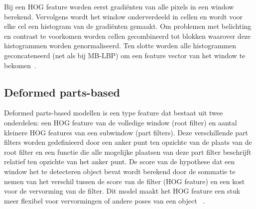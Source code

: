 Bij een HOG feature worden eerst gradi\"enten van alle pixels in een window berekend. Vervolgens wordt het window onderverdeeld in cellen en wordt voor elke cel een histogram van de gradi\"enten gemaakt. Om problemen met belichting en contrast te voorkomen worden cellen gecombineerd tot blokken waarover deze histogrammen worden genormaliseerd. Ten slotte worden alle histogrammen geconcateneerd (net als bij MB-LBP) om een feature vector van het window te bekomen~\cite{dalal2005histograms}.

%

\subsection{Deformed parts-based} \label{sec:feat_part}
Deformed parts-based modellen is een type feature dat bestaat uit twee onderdelen: een HOG feature van de volledige window (root filter) en aantal kleinere HOG features van een subwindow (part filters). Deze verschillende part filters worden gedefinieerd door een anker punt ten opzichte van de plaats van de root filter en een functie die alle mogelijke plaatsen van deze part filter beschrijft relatief ten opzichte van het anker punt. De score van de hypothese dat een window het te detecteren object bevat wordt berekend door de sommatie te nemen van het verschil tussen de score van de filter (HOG feature) en een kost voor de vervorming van de filter. Dit model maakt het HOG feature een stuk meer flexibel voor vervormingen of andere poses van een object ~\cite{felzenszwalb2010object}.

